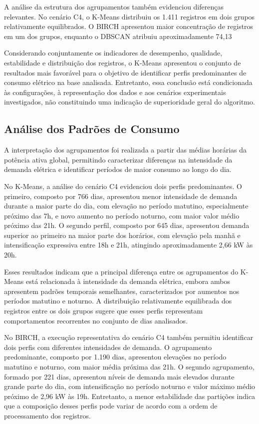 \documentclass[lettersize,journal]{IEEEtran}
\begin{document}
A análise da estrutura dos agrupamentos também evidenciou diferenças relevantes. No cenário C4, o K-Means distribuiu os 1.411 registros em dois grupos relativamente equilibrados. O BIRCH apresentou maior concentração de registros em um dos grupos, enquanto o DBSCAN atribuiu aproximadamente 74,13%

Considerando conjuntamente os indicadores de desempenho, qualidade, estabilidade e distribuição dos registros, o K-Means apresentou o conjunto de resultados mais favorável para o objetivo de identificar perfis predominantes de consumo elétrico na base analisada. Entretanto, essa conclusão está condicionada às configurações, à representação dos dados e aos cenários experimentais investigados, não constituindo uma indicação de superioridade geral do algoritmo.

\subsection{Análise dos Padrões de Consumo}
A interpretação dos agrupamentos foi realizada a partir das médias horárias da potência ativa global, permitindo caracterizar diferenças na intensidade da demanda elétrica e identificar períodos de maior consumo ao longo do dia.

No K-Means, a análise do cenário C4 evidenciou dois perfis predominantes. O primeiro, composto por 766 dias, apresentou menor intensidade de demanda durante a maior parte do dia, com elevação no período matutino, especialmente próximo das 7h, e novo aumento no período noturno, com maior valor médio próximo das 21h. O segundo perfil, composto por 645 dias, apresentou demanda superior ao primeiro na maior parte dos horários, com elevação pela manhã e intensificação expressiva entre 18h e 21h, atingindo aproximadamente 2,66 kW às 20h.

Esses resultados indicam que a principal diferença entre os agrupamentos do K-Means está relacionada à intensidade da demanda elétrica, embora ambos apresentem padrões temporais semelhantes, caracterizados por aumentos nos períodos matutino e noturno. A distribuição relativamente equilibrada dos registros entre os dois grupos sugere que esses perfis representam comportamentos recorrentes no conjunto de dias analisados.

No BIRCH, a execução representativa do cenário C4 também permitiu identificar dois perfis com diferentes intensidades de demanda. O agrupamento predominante, composto por 1.190 dias, apresentou elevações no período matutino e noturno, com maior média próxima das 21h. O segundo agrupamento, formado por 221 dias, apresentou níveis de demanda mais elevados durante grande parte do dia, com intensificação no período noturno e valor máximo médio próximo de 2,96 kW às 19h. Entretanto, a menor estabilidade das partições indica que a composição desses perfis pode variar de acordo com a ordem de processamento dos registros.
\end{document}

